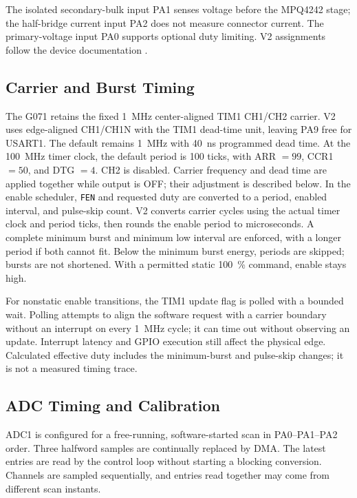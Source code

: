 The isolated secondary-bulk input PA1 senses voltage before the MPQ4242 stage; the half-bridge current input PA2 does not measure connector current. The primary-voltage input PA0 supports optional duty limiting. V2 assignments follow the device documentation \cite{ststm32f410ds,ststm32f410rm}.

\subsection{Carrier and Burst Timing}

The G071 retains the fixed \SI{1}{\mega\hertz} center-aligned TIM1 CH1/CH2 carrier. V2 uses edge-aligned CH1/CH1N with the TIM1 dead-time unit, leaving PA9 free for USART1. The default remains \SI{1}{\mega\hertz} with \SI{40}{\nano\second} programmed dead time. At the \SI{100}{\mega\hertz} timer clock, the default period is 100 ticks, with ARR \(=99\), CCR1 \(=50\), and DTG \(=4\). CH2 is disabled. Carrier frequency and dead time are applied together while output is OFF; their adjustment is described below.
In the enable scheduler, \texttt{FEN} and requested duty are converted to a period, enabled interval, and pulse-skip count. V2 converts carrier cycles using the actual timer clock and period ticks, then rounds the enable period to microseconds. A complete minimum burst and minimum low interval are enforced, with a longer period if both cannot fit. Below the minimum burst energy, periods are skipped; bursts are not shortened. With a permitted static \SI{100}{\percent} command, enable stays high.

For nonstatic enable transitions, the TIM1 update flag is polled with a bounded wait. Polling attempts to align the software request with a carrier boundary without an interrupt on every \SI{1}{\mega\hertz} cycle; it can time out without observing an update. Interrupt latency and GPIO execution still affect the physical edge. Calculated effective duty includes the minimum-burst and pulse-skip changes; it is not a measured timing trace.

\subsection{ADC Timing and Calibration}

ADC1 is configured for a free-running, software-started scan in PA0--PA1--PA2 order. Three halfword samples are continually replaced by DMA. The latest entries are read by the control loop without starting a blocking conversion. Channels are sampled sequentially, and entries read together may come from different scan instants.

